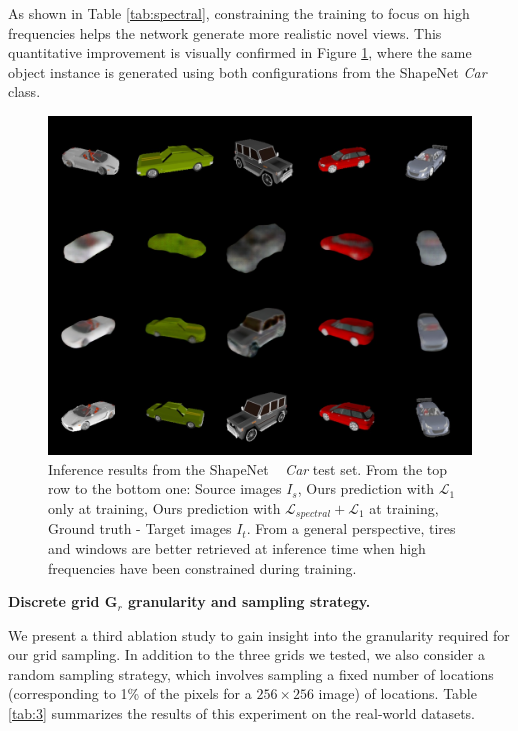 As shown in Table \ref{tab:spectral}, constraining the training to focus on high frequencies helps the network generate more realistic novel views. This quantitative improvement is visually confirmed in Figure \ref{fig:spectral_res}, where the same object instance is generated using both configurations from the ShapeNet \textit{Car} class.\newline 

\begin{figure}[h!]
    \begin{center}
    \includegraphics[width=\textwidth]{images/epipolarnvs/spectralCar.jpg}
    \end{center}
     \caption{Inference results from the ShapeNet ~\cite{chang2015shapenet} \textit{Car} test set. From the top row to the bottom one: Source images  $I_s$, Ours prediction with $\mathcal{L}_{1}$ only at training, Ours prediction with  $\mathcal{L}_{spectral} + \mathcal{L}_{1}$ at training, Ground truth - Target images $I_t$. From a general perspective, tires and windows are better retrieved at inference time when high frequencies have been constrained during training.}
     \label{fig:spectral_res}
\end{figure}

\textbf{Discrete grid $\textbf{G}_{r}$ granularity and sampling strategy.}

We present a third ablation study to gain insight into the granularity required for our grid sampling. In addition to the three grids we tested, we also consider a random sampling strategy, which involves sampling a fixed number of locations (corresponding to 1\% of the pixels for a $256\times 256$ image) of locations. Table \ref{tab:3} summarizes the results of this experiment on the real-world datasets.

